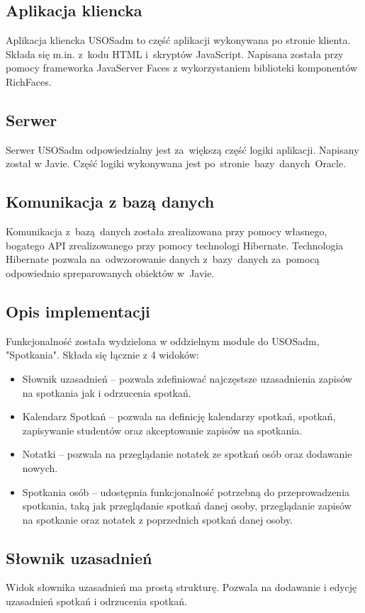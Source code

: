 \documentclass[licencjacka]{pracamgr}
\begin{document}
\subsection{Aplikacja kliencka}
Aplikacja kliencka USOSadm to część aplikacji wykonywana po stronie klienta. Składa się m.in. z~kodu HTML i~skryptów JavaScript. Napisana została przy pomocy frameworka JavaServer Faces z wykorzystaniem biblioteki komponentów RichFaces.

\subsection{Serwer}
Serwer USOSadm odpowiedzialny jest za~większą część logiki aplikacji. Napisany został w Javie. Część logiki wykonywana jest po~stronie~bazy~danych~Oracle.

\subsection{Komunikacja z bazą danych}
Komunikacja z~bazą~danych została zrealizowana przy pomocy własnego, bogatego API zrealizowanego przy pomocy technologi Hibernate. Technologia Hibernate pozwala na~odwzorowanie danych z~bazy~danych za~pomocą odpowiednio spreparowanych obiektów w~Javie.

\subsection{Opis implementacji}
Funkcjonalność została wydzielona w oddzielnym module do USOSadm, "Spotkania". Składa się łącznie z 4 widoków:
\begin{itemize}
\item Słownik uzasadnień -- pozwala zdefiniować najczęstsze uzasadnienia zapisów na spotkania jak i odrzucenia spotkań.
\item Kalendarz Spotkań -- pozwala na definicję kalendarzy spotkań, spotkań, zapisywanie studentów oraz akceptowanie zapisów na spotkania.
\item Notatki -- pozwala na przeglądanie notatek ze spotkań osób oraz dodawanie nowych.
\item Spotkania osób -- udostępnia funkcjonalność potrzebną do przeprowadzenia spotkania, taką jak przeglądanie spotkań danej osoby, przeglądanie zapisów na spotkanie oraz notatek z poprzednich spotkań danej osoby.
\end{itemize}

\subsection{Słownik uzasadnień}
Widok słownika uzasadnień ma prostą strukturę. Pozwala na dodawanie i edycję uzasadnień spotkań i odrzucenia spotkań.
\end{document}
